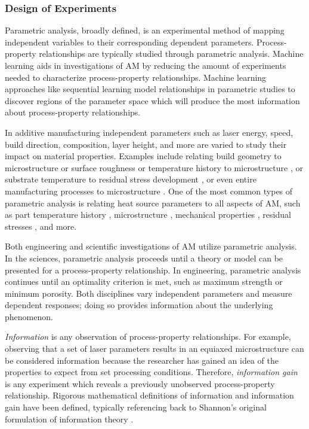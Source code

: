 \subsubsection{Design of Experiments}
Parametric analysis, broadly defined, is an experimental method of mapping independent variables to their corresponding dependent parameters. Process-property relationships are typically studied through parametric analysis. Machine learning aids in investigations of AM by reducing the amount of experiments needed to characterize process-property relationships. Machine learning approaches like sequential learning model relationships in parametric studies to discover regions of the parameter space which will produce the most information about process-property relationships. 

 In additive manufacturing independent parameters such as laser energy, speed, build direction, composition, layer height, and more are varied to study their impact on material properties. Examples include relating build geometry to microstructure or surface roughness \cite{Antonysamy2013, Strano2013} or temperature history to microstructure \cite{Bontha2009, Nie2014}, or substrate temperature to residual stress development \cite{Chen2016, Brice2018}, or even entire manufacturing processes to microstructure \cite{Baufeld2011}. One of the most common types of parametric analysis is relating heat source parameters to all aspects of AM, such as part temperature history \cite{Bontha2006, Li2014}, microstructure \cite{Cherry2015, Jia2014}, mechanical properties \cite{Delgado2012, Khorasani2018}, residual stresses \cite{Wu2014, Denlinger2015}, and more.

Both engineering and scientific investigations of AM utilize parametric analysis. In the sciences, parametric analysis proceeds until a theory or model can be presented for a process-property relationship. In engineering, parametric analysis continues until an optimality criterion is met, such as maximum strength or minimum porosity. Both disciplines vary independent parameters and measure dependent responses; doing so provides information about the underlying phenomenon. 

\textit{Information} is any observation of process-property relationships. For example, observing that a set of laser parameters results in an equiaxed microstructure can be considered information because the researcher has gained an idea of the properties to expect from set processing conditions. Therefore, \textit{information gain} is any experiment which reveals a previously unobserved process-property relationship. Rigorous mathematical definitions of information and information gain have been defined, typically referencing back to Shannon's original formulation of information theory \cite{Shannon1948}.

